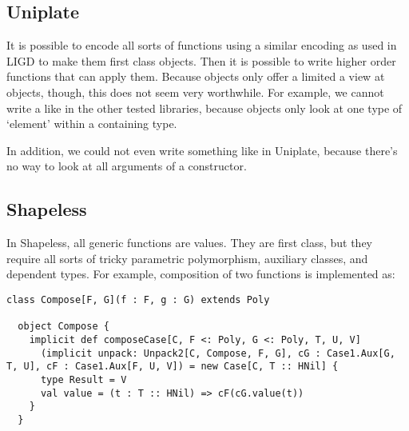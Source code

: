 

\subsection{Uniplate}
It is possible to encode all sorts of functions using a similar encoding
as used in LIGD to make them first class objects. Then it is possible to write
higher order functions that can apply them. Because  objects only offer
a limited a view at objects, though, this does not seem very worthwhile. For
example, we cannot write a  like in the other tested libraries, because
 objects only look at one type of `element' within a containing
type.

In addition, we could not even write something like  in Uniplate,
because there's no way to look at all arguments of a constructor.


\subsection{Shapeless}
In Shapeless, all generic functions are  values. They are first class,
but they require all sorts of tricky parametric polymorphism, auxiliary
classes, and dependent types. For example, composition of two functions is
implemented as:
\begin{lstlisting}[caption=Composition of two Poly values (copied from shapeless),style=breaklines]
  class Compose[F, G](f : F, g : G) extends Poly

  object Compose {
    implicit def composeCase[C, F <: Poly, G <: Poly, T, U, V]
      (implicit unpack: Unpack2[C, Compose, F, G], cG : Case1.Aux[G, T, U], cF : Case1.Aux[F, U, V]) = new Case[C, T :: HNil] {
      type Result = V
      val value = (t : T :: HNil) => cF(cG.value(t))
    }
  }
\end{lstlisting}

